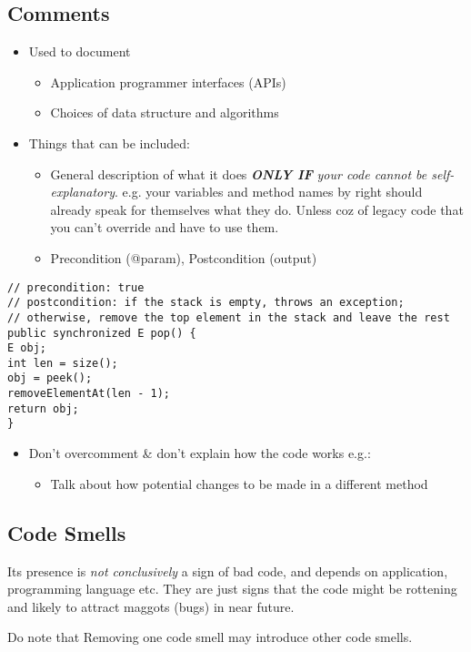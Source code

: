 \documentclass[a4paper]{article}
\begin{document}
\subsection{Comments}
\begin{itemize}
	\item Used to document
	\begin{itemize}[label=$\circ$]
		\item Application programmer interfaces (APIs)
		\item Choices of data structure and algorithms
	\end{itemize}
	\item Things that can be included:
	\begin{itemize}[label=$\circ$]
		\item General description of what it does \textbf{\textit{ONLY IF}} \textit{your code cannot be self-explanatory}. e.g. your variables and method names by right should already speak for themselves what they do. Unless coz of legacy code that you can't override and have to use them.
		\item Precondition (@param), Postcondition (output)
	\end{itemize}
\end{itemize}
\begin{verbatim}
// precondition: true
// postcondition: if the stack is empty, throws an exception; 
// otherwise, remove the top element in the stack and leave the rest
public synchronized E pop() {
E obj;
int len = size();
obj = peek();
removeElementAt(len - 1);
return obj;
}
\end{verbatim}
\begin{itemize}
	\item Don’t overcomment \& don't explain how the code works e.g.:
	\begin{itemize}[label=$\circ$]
		\item Talk about how potential changes to be made in a different method
	\end{itemize}
\end{itemize}
\subsection{Code Smells}
Its presence is \textit{not conclusively} a sign of bad code, and depends on application, programming language etc. They are just signs that the code might be rottening and likely to attract maggots (bugs) in near future.
\begin{framed}
	\begin{displayquote}
		Do note that Removing one code smell may introduce other code smells.
	\end{displayquote}
\end{framed}
\end{document}
